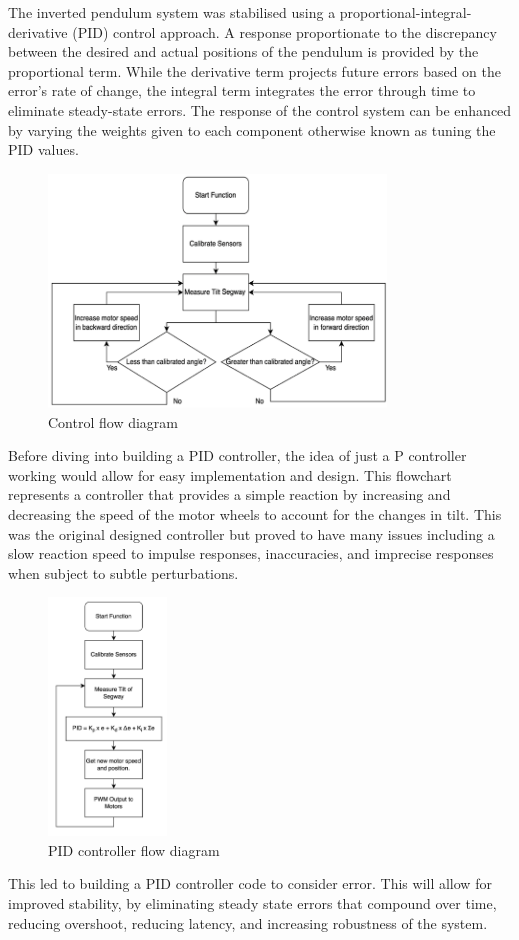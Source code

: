 \vspace{2mm}

The inverted pendulum system was stabilised using a proportional-integral-derivative (PID) control approach. A response proportionate to the discrepancy between the desired and actual positions of the pendulum is provided by the proportional term. While the derivative term projects future errors based on the error's rate of change, the integral term integrates the error through time to eliminate steady-state errors. The response of the control system can be enhanced by varying the weights given to each component otherwise known as tuning the PID values.

\begin{figure}
    \centerline{\includegraphics[width=0.8\textwidth]{images/control-flow.png}}
    \caption{Control flow diagram}
\end{figure}
Before diving into building a PID controller, the idea of just a P controller working would allow for easy implementation and design. This flowchart represents a controller that provides a simple reaction by increasing and decreasing the speed of the motor wheels to account for the changes in tilt. This was the original designed controller but proved to have many issues including a slow reaction speed to impulse responses, inaccuracies, and imprecise responses when subject to subtle perturbations.  

\begin{figure}
    \centerline{\includegraphics[width=0.28\textwidth]{images/pid-flow.png}}
    \caption{PID controller flow diagram}
\end{figure}
This led to building a PID controller code to consider error. This will allow for improved stability, by eliminating steady state errors that compound over time, reducing overshoot, reducing latency, and increasing robustness of the system.

